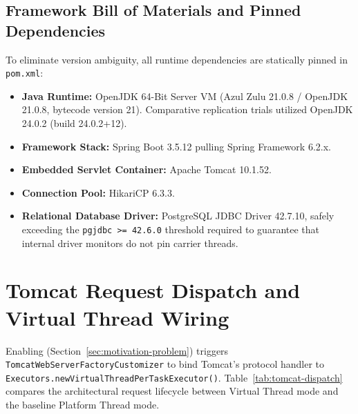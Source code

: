 \subsection{Framework Bill of Materials and Pinned Dependencies}
To eliminate version ambiguity, all runtime dependencies are statically pinned in \texttt{pom.xml}:
\begin{itemize}
  \item \textbf{Java Runtime:} OpenJDK 64-Bit Server VM (Azul Zulu 21.0.8 / OpenJDK 21.0.8, bytecode version 21). Comparative replication trials utilized OpenJDK 24.0.2 (build 24.0.2+12).
  \item \textbf{Framework Stack:} Spring Boot 3.5.12 pulling Spring Framework 6.2.x.
  \item \textbf{Embedded Servlet Container:} Apache Tomcat 10.1.52.
  \item \textbf{Connection Pool:} HikariCP 6.3.3.
  \item \textbf{Relational Database Driver:} PostgreSQL JDBC Driver 42.7.10, safely exceeding the \texttt{pgjdbc >= 42.6.0} threshold required to guarantee that internal driver monitors do not pin carrier threads.
\end{itemize}

\section{Tomcat Request Dispatch and Virtual Thread Wiring}
\label{sec:tomcat-dispatch}

Enabling  (Section~\ref{sec:motivation-problem}) triggers \texttt{TomcatWeb\-Server\-Factory\-Customizer} to bind Tomcat's protocol handler to \texttt{Executors.\allowbreak new\-Virtual\-Thread\-Per\-Task\-Executor()}. Table~\ref{tab:tomcat-dispatch} compares the architectural request lifecycle between Virtual Thread mode and the baseline Platform Thread mode.

